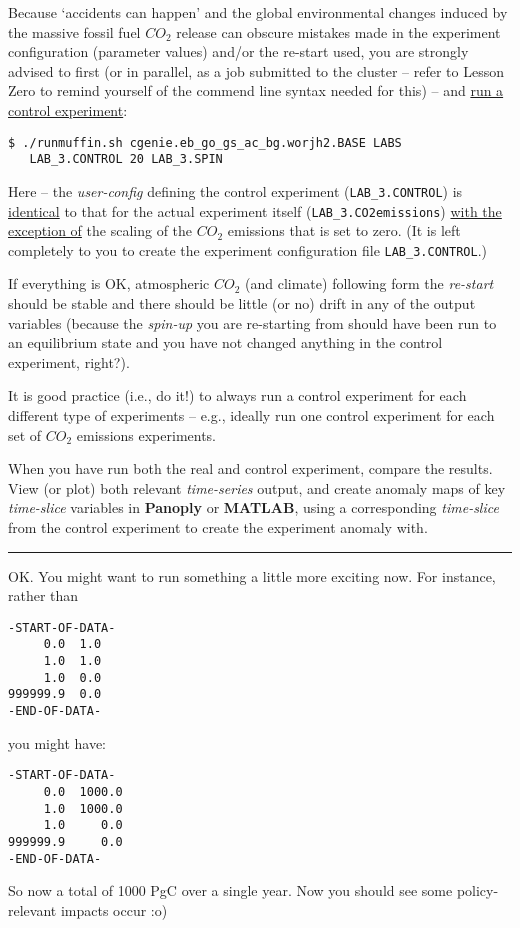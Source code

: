 \documentclass[11pt,fleqn]{book} %
\begin{document}
\noindent Because ‘accidents can happen’ and the global environmental changes induced by the massive fossil fuel \(CO_{2}\) release can obscure mistakes made in the experiment configuration (parameter values) and/or the re-start used, you are strongly advised to first (or in parallel, as a job submitted to the cluster – refer to Lesson Zero to remind yourself of the commend line syntax needed for this) --  and \uline{run a control experiment}:
\vspace{-2pt}\begin{verbatim}
$ ./runmuffin.sh cgenie.eb_go_gs_ac_bg.worjh2.BASE LABS
   LAB_3.CONTROL 20 LAB_3.SPIN
\end{verbatim}\vspace{-2pt}
Here – the \textit{user-config} defining the control experiment (\texttt{LAB\_3.CONTROL}) is \uline{identical} to that for the actual experiment itself (\texttt{LAB\_3.CO2emissions}) \uline{with the exception of} the scaling of the \(CO_{2}\) emissions that is set to zero. (It is left completely to you to create the experiment configuration file \texttt{LAB\_3.CONTROL}.)

If everything is OK, atmospheric \(CO_{2}\) (and climate) following form the \textit{re-start} should be stable and there should be little (or no) drift in any of the output variables (because the \textit{spin-up} you are re-starting from should have been run to an equilibrium state and you have not changed anything in the control experiment, right?).

It is good practice (i.e., do it!) to always run a control experiment for each different type of experiments – e.g., ideally run one control experiment for each set of \(CO_{2}\) emissions experiments.

When you have run both the real and control experiment, compare the results. View (or plot) both relevant \textit{time-series} output, and create anomaly maps of key \textit{time-slice} variables in \textbf{Panoply} or \textbf{MATLAB}, using a corresponding \textit{time-slice} from the control experiment to create the experiment anomaly with.

\vspace{1mm}
\noindent\rule{4cm}{0.1mm}
\vspace{2mm}

\noindent OK. You might want to run something a little more exciting now. For instance, rather than
\vspace{-2pt}\begin{verbatim}
-START-OF-DATA-
     0.0  1.0 
     1.0  1.0
     1.0  0.0
999999.9  0.0
-END-OF-DATA-
\end{verbatim}\vspace{-2pt}
you might have: 
\vspace{-2pt}\begin{verbatim}
-START-OF-DATA-
     0.0  1000.0 
     1.0  1000.0
     1.0     0.0
999999.9     0.0
-END-OF-DATA-
\end{verbatim}\vspace{-2pt}
So now a total of 1000 PgC over a single year. Now you should see some policy-relevant impacts occur :o)
\end{document}
